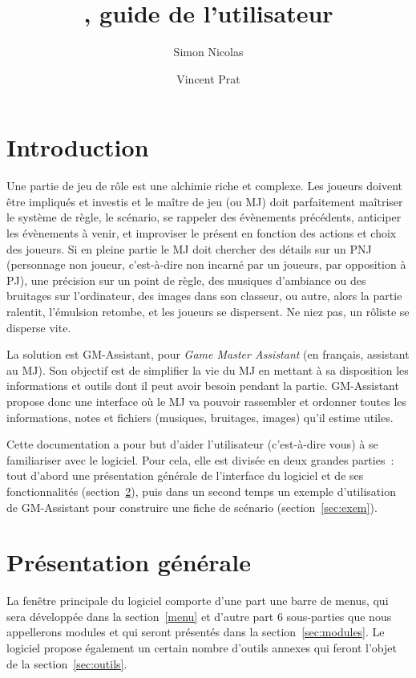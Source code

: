 \documentclass[a4paper,12pt]{article}
\title{\GMA \versionnumber, guide de l'utilisateur}
\author{Simon Nicolas \and Vincent Prat}
\newcommand*{\GMA}{GM-Assistant\xspace}
\begin{document}
\maketitle

\tableofcontents

\section{Introduction}

Une partie de jeu de rôle est une alchimie riche et complexe.
Les joueurs doivent être impliqués et investis et le maître de jeu (ou MJ) doit parfaitement maîtriser le système de règle, le scénario, se rappeler des évènements précédents, anticiper les évènements à venir, et improviser le présent en fonction des actions et choix des joueurs.
Si en pleine partie le MJ doit chercher des détails sur un PNJ (personnage non joueur, c'est-à-dire non incarné par un joueurs, par opposition à PJ), une précision sur un point de règle, des musiques d'ambiance ou des bruitages sur l'ordinateur, des images dans son classeur, ou autre, alors la partie ralentit, l'émulsion retombe, et les joueurs se dispersent.
Ne niez pas, un rôliste se disperse vite.

La solution est \GMA, pour \emph{Game Master Assistant} (en français, assistant au MJ).
Son objectif est de simplifier la vie du MJ en mettant à sa disposition les informations et outils dont il peut avoir besoin pendant la partie.
\GMA propose donc une interface où le MJ va pouvoir rassembler et ordonner toutes les informations, notes et fichiers (musiques, bruitages, images) qu'il estime utiles.

Cette documentation a pour but d'aider l'utilisateur (c'est-à-dire vous) à se familiariser avec le logiciel.
Pour cela, elle est divisée en deux grandes parties~: tout d'abord une présentation générale de l'interface du logiciel et de ses fonctionnalités (section~\ref{sec:pres}), puis dans un second temps un exemple d'utilisation de \GMA pour construire une fiche de scénario (section~\ref{sec:exem}).

\section{Présentation générale}
\label{sec:pres}

La fenêtre principale du logiciel comporte d'une part une barre de menus, qui sera développée dans la section~\ref{menu} et d'autre part 6 sous-parties que nous appellerons modules et qui seront présentés dans la section~\ref{sec:modules}.
Le logiciel propose également un certain nombre d'outils annexes qui feront l'objet de la section~\ref{sec:outils}.
\end{document}
